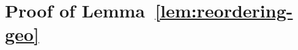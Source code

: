 \documentclass[12pt]{article}
\newcommand{\df}{\mathrm{d}}
\newcommand{\ind}{\mathbf{1}}
\begin{document}

{
\section{Proof of Lemma~\ref{lem:reordering-geo}} \label{app:reordering-geo}
}
\end{document}
